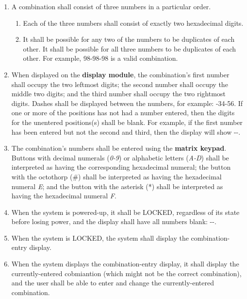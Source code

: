 \begin{enumerate}
\item A combination shall consist of three numbers in a particular order.
    \begin{enumerate}
    \item Each of the three numbers shall consist of exactly two hexadecimal
        digits.
    \item It shall be possible for any two of the numbers to be duplicates of
        each other. It shall be possible for all three numbers to be duplicates
        of each other. For example, 98-98-98 is a valid combination.
    \end{enumerate}
\item When displayed on the \textbf{display module}, the combination's first
    number shall occupy the two leftmost digits; the second number shall occupy
    the middle two digits; and the third number shall occupy the two rightmost
    digits. Dashes shall be displayed between the numbers, for example:
    {-34-56}. If one or more of the positions has not had a number
    entered, then the digits for the unentered positions(s) shall be blank.
    For example, if the first number has been entered but not the second and
    third, then the display will show {-\phantom{88}-\phantom{88}}.
\item The combination's numbers shall be entered using the \textbf{matrix
    keypad}. Buttons with decimal numerals (\textit{0-9}) or alphabetic letters
    (\textit{A-D}) shall be interpreted as having the corresponding hexadecimal
    numeral; the button with the octothorp (\#) shall be interpreted as having
    the hexadecimal numeral \textit{E}; and the button with the asterisk (*)
    shall be interpreted as having the hexadecimal numeral \textit{F}.
\item When the system is powered-up, it shall be LOCKED, regardless of its state
    before losing power, and the display shall have all numbers blank:
    {\dviiseg \phantom{88}-\phantom{88}-\phantom{88}}.
\item When the system is LOCKED, the system shall display the combination-entry
    display.
\item \label{spec:enterCombination} When the system displays the
    combination-entry display, it shall display the currently-entered
    cobmiantion (which might not be the correct combination), and the user shall
    be able to enter and change the currently-entered combination.
    \begin{enumerate}

\end{enumerate}
\end{enumerate}
